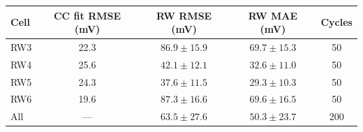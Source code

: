 \begin{tabular}{lcccc}
\toprule
Cell & CC fit RMSE (mV) & RW RMSE (mV) & RW MAE (mV) & Cycles \\
\midrule
RW3 & 22.3 & $86.9 \pm 15.9$ & $69.7 \pm 15.3$ & 50 \\
RW4 & 25.6 & $42.1 \pm 12.1$ & $32.6 \pm 11.0$ & 50 \\
RW5 & 24.3 & $37.6 \pm 11.5$ & $29.3 \pm 10.3$ & 50 \\
RW6 & 19.6 & $87.3 \pm 16.6$ & $69.6 \pm 16.5$ & 50 \\
\midrule
All & --- & $63.5 \pm 27.6$ & $50.3 \pm 23.7$ & 200 \\
\bottomrule
\end{tabular}
